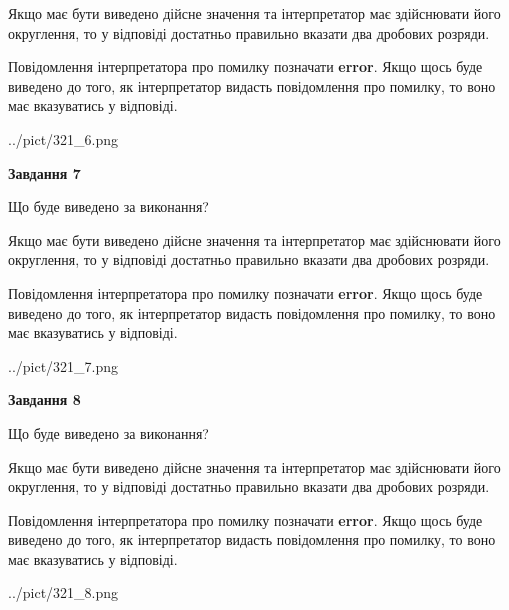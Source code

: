 \documentclass[12pt, ukrainian]{article}
\begin{document}
{\begin {Large}
Якщо має бути виведено дійсне значення та інтерпретатор має здійснювати його округлення, 
то у відповіді достатньо правильно вказати два дробових розряди.

Повідомлення інтерпретатора про помилку позначати \textbf{error}.
Якщо щось буде виведено до того, як інтерпретатор видасть повідомлення про помилку, 
то воно має вказуватись у відповіді. \par

\begin{center}
	{../pict/321_6.png}
\end{center}
\newpage

{\begin {center}\textbf{Завдання 7}\end {center}}\par
Що буде виведено за виконання? \par

Якщо має бути виведено дійсне значення та інтерпретатор має здійснювати його округлення, 
то у відповіді достатньо правильно вказати два дробових розряди.

Повідомлення інтерпретатора про помилку позначати \textbf{error}.
Якщо щось буде виведено до того, як інтерпретатор видасть повідомлення про помилку, 
то воно має вказуватись у відповіді. \par

\begin{center}
	{../pict/321_7.png}
\end{center}
\newpage

{\begin {center}\textbf{Завдання 8}\end {center}}\par
Що буде виведено за виконання? \par

Якщо має бути виведено дійсне значення та інтерпретатор має здійснювати його округлення, 
то у відповіді достатньо правильно вказати два дробових розряди.

Повідомлення інтерпретатора про помилку позначати \textbf{error}.
Якщо щось буде виведено до того, як інтерпретатор видасть повідомлення про помилку, 
то воно має вказуватись у відповіді. \par

\begin{center}
	{../pict/321_8.png}
\end{center}
\newpage


\end{Large}}
\end{document}
